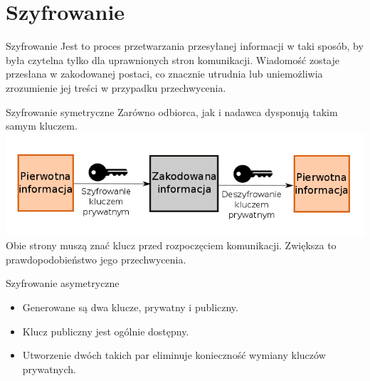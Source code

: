 \section{Szyfrowanie}

\begin{frame}
	\begin{alertblock}{Szyfrowanie}
		Jest to proces przetwarzania przesyłanej informacji w taki sposób, by była czytelna tylko dla uprawnionych stron komunikacji. Wiadomość zostaje przesłana w zakodowanej postaci, co znacznie utrudnia lub uniemożliwia zrozumienie jej treści w przypadku przechwycenia.
	\end{alertblock}
\end{frame}

\begin{frame}{Szyfrowanie symetryczne}
	Zarówno odbiorca, jak i nadawca dysponują takim samym kluczem.\\
	\vspace{\fill}
	\includegraphics[height=0.25\paperwidth]{images/priv-key.png}
	\vspace{\fill}
	Obie strony muszą znać klucz przed rozpoczęciem komunikacji. Zwiększa to prawdopodobieństwo jego przechwycenia.	
\end{frame}

\begin{frame}{Szyfrowanie asymetryczne}
		\begin{itemize}
			\item Generowane są dwa klucze, prywatny i publiczny.
			\item Klucz publiczny jest ogólnie dostępny.
			\item Utworzenie dwóch takich par eliminuje konieczność wymiany kluczów prywatnych. 
		\end{itemize}	
\end{frame}

